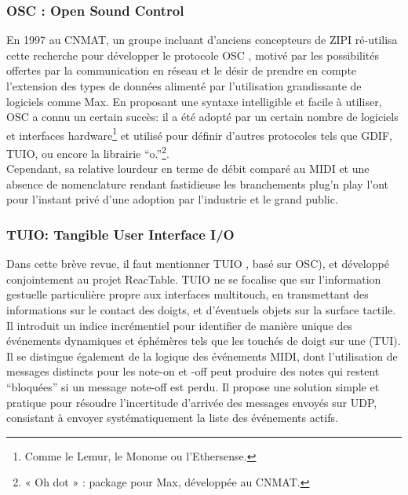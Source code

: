 \subsubsection{OSC : Open Sound Control}

\noindent En 1997 au \gls{CNMAT}, un groupe incluant d'anciens concepteurs de \gls{ZIPI} ré-utilisa cette recherche pour développer le protocole \gls{OSC} \cite{wright_open_1997}, motivé par les possibilités offertes par la communication en réseau et le désir de prendre en compte l'extension des types de données alimenté par l'utilisation grandissante de logiciels comme Max. En proposant une syntaxe intelligible et facile à utiliser, \gls{OSC} a connu un certain succès: il a été adopté par un certain nombre de logiciels et interfaces hardware\footnote{ Comme le Lemur, le Monome ou l'Ethersense.} et utilisé pour définir d'autres protocoles tels que \gls{GDIF}, \gls{TUIO}, ou encore la librairie ``o.''\footnote{ « Oh dot » : package pour Max, développée au \gls{CNMAT}.}.\\
\indent Cependant, sa relative lourdeur en terme de débit comparé au \gls{MIDI} \cite{fraietta_open_2008} et une absence de nomenclature rendant fastidieuse les branchements plug'n play l'ont pour l'instant privé d'une adoption par l'industrie et le grand public.

\subsubsection{TUIO: Tangible User Interface I/O}

\noindent Dans cette brève revue, il faut mentionner \gls{TUIO} \cite{kaltenbrunner_tuio:_2005}, basé sur \gls{OSC}), et développé conjointement au projet ReacTable. \gls{TUIO} ne se focalise que sur l'information gestuelle particulière propre aux interfaces multitouch, en transmettant des informations sur le contact des doigts, et d'éventuels objets sur la surface tactile. Il introduit un indice incrémentiel pour identifier de manière unique des événements dynamiques et éphémères tels que les touchés de doigt sur une (\gls{TUI}). Il se distingue également de la logique des événements \gls{MIDI}, dont l'utilisation de messages distincts pour les note-on et -off peut produire des notes qui restent ``bloquées'' si un message note-off est perdu. Il propose une solution simple et pratique pour résoudre l'incertitude d'arrivée des messages envoyés sur \gls{UDP}, consistant à envoyer systématiquement la liste des événements actifs.

